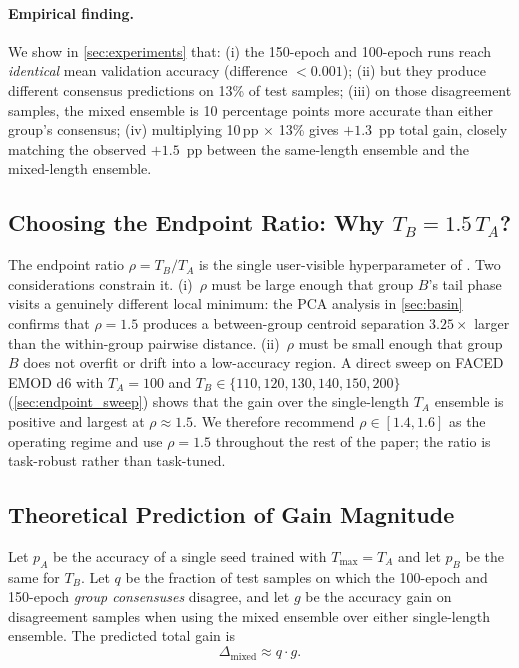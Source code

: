 \paragraph{Empirical finding.}
We show in \cref{sec:experiments} that:
(i) the 150-epoch and 100-epoch runs reach \emph{identical} mean
validation accuracy (difference $<\!0.001$);
(ii) but they produce different consensus predictions on 13\% of test samples;
(iii) on those disagreement samples, the mixed ensemble is 10 percentage
points more accurate than either group's consensus;
(iv) multiplying 10\,pp $\times$ 13\% gives $+1.3$~pp total gain, closely
matching the observed $+1.5$~pp between the same-length ensemble and the
mixed-length ensemble.

\subsection{Choosing the Endpoint Ratio: Why $T_B = 1.5\,T_A$?}
\label{sec:why_150}

The endpoint ratio $\rho = T_B / T_A$ is the single user-visible
hyperparameter of \ours. Two considerations constrain it. (i)~$\rho$
must be large enough that group $B$'s tail phase visits a genuinely
different local minimum: the PCA analysis in \cref{sec:basin} confirms
that $\rho = 1.5$ produces a between-group centroid separation
$3.25\times$ larger than the within-group pairwise distance. (ii)~$\rho$
must be small enough that group $B$ does not overfit or drift into a
low-accuracy region. A direct sweep on FACED EMOD d6 with
$T_A=100$ and $T_B \in \{110, 120, 130, 140, 150, 200\}$
(\cref{sec:endpoint_sweep}) shows that the gain over the single-length
$T_A$ ensemble is positive and largest at $\rho \approx 1.5$. We therefore
recommend $\rho \in [1.4, 1.6]$ as the operating regime and use $\rho = 1.5$
throughout the rest of the paper; the ratio is task-robust rather than
task-tuned.

\subsection{Theoretical Prediction of Gain Magnitude}

Let $p_A$ be the accuracy of a single seed trained with $T_\mathrm{max}=T_A$
and let $p_B$ be the same for $T_B$. Let $q$ be the fraction of test samples
on which the 100-epoch and 150-epoch \emph{group consensuses} disagree, and
let $g$ be the accuracy gain on disagreement samples when using the mixed
ensemble over either single-length ensemble. The predicted total gain is
\[
\Delta_{\mathrm{mixed}} \approx q \cdot g.
\]

